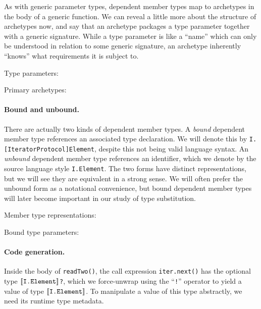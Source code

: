 \documentclass[../generics]{subfiles}
\begin{document}
As with generic parameter types, dependent member types map to archetypes in the body of a generic function. We can reveal a little more about the structure of archetypes now, and say that an archetype packages a type parameter together with a generic signature. While a type parameter is like a ``name'' which can only be understood in relation to some generic signature, an archetype inherently ``knows'' what requirements it is subject to.

\begin{MoreDetails}
\item Type parameters: 
\item Primary archetypes: 
\end{MoreDetails}

\paragraph{Bound and unbound.}
There are actually two kinds of dependent member types. A \emph{bound} dependent member type references an associated type declaration. We will denote this by \verb|I.[IteratorProtocol]Element|, despite this not being valid language syntax. An \emph{unbound} dependent member type references an identifier, which we denote by the source language style \texttt{I.Element}. The two forms have distinct representations, but we will see they are equivalent in a strong sense. We will often prefer the unbound form as a notational convenience, but bound dependent member types will later become important in our study of type substitution.

\begin{MoreDetails}
\item Member type representations: 
\item Bound type parameters: 
\end{MoreDetails}

\paragraph{Code generation.}
Inside the body of \verb|readTwo()|, the call expression \verb|iter.next()| has the optional type \texttt{$[\![\texttt{I.Element}]\!]$?}, which we force-unwrap using the ``\texttt{!}'' operator to yield a value of type $[\![\texttt{I.Element}]\!]$. To manipulate a value of this type abstractly, we need its runtime type metadata.
\end{document}
